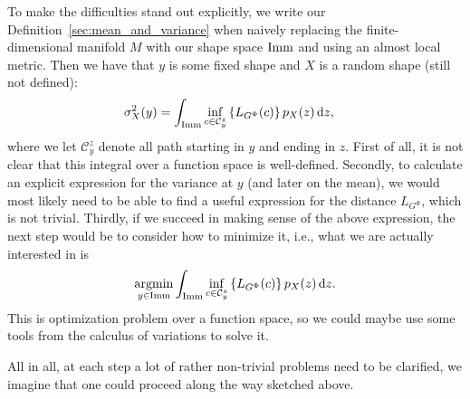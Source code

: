 \message{ !name(mainfile.tex)}\documentclass[a4,danish]{article}
\begin{document}
To make the difficulties stand out explicitly, we write our Definition~\ref{sec:mean_and_variance} when naively replacing the finite-dimensional manifold $M$ with our shape space $\mathop{}\!\mathrm{Imm}$ and using an almost local metric. Then we have that $y$ is some fixed shape and $X$ is a random shape (still not defined):
\begin{align*}
  \sigma^2_X(y) &  = \int_{\mathop{}\!\mathrm{Imm}}
                  \inf_{c \in \mathcal{C}_{y}^z}
                  \left\{
                  L_{G^\Phi}(c)
                  \right\}
                  p_X(z)
                  \mathop{}\!\mathrm{d} z
  ,
\end{align*}
where we let $\mathcal{C}_y^z$ denote all path starting in $y$ and ending in $z$.
First of all, it is not clear that this integral over a function space is well-defined.
Secondly, to calculate an explicit expression for the variance at $y$ (and later on the mean), we would most likely need to be able to find a useful expression for the distance $L_{G^{\Phi}}$, which is not trivial.
Thirdly, if we succeed in making sense of the above expression, the next step would be to consider how to minimize it, i.e., what we are actually interested in is
\begin{equation*}
  \operatorname*{argmin}_{y \in \mathop{}\!\mathrm{Imm}}
  \int_{\mathop{}\!\mathrm{Imm}}
  \inf_{c \in \mathcal{C}_{y}^z}
  \left\{
    L_{G^\Phi}(c)
  \right\}
  p_X(z)
  \mathop{}\!\mathrm{d} z.
\end{equation*}
This is optimization problem over a function space, so we could maybe use some tools from the calculus of variations to solve it.

All in all, at each step a lot of rather non-trivial problems need to be clarified, we imagine that one could proceed along the way sketched above.



\end{document}
